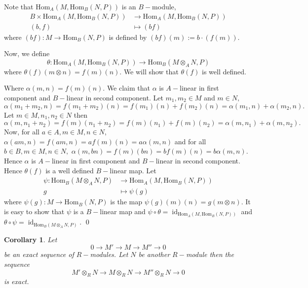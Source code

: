 \documentclass[11pt]{amsart}
\newtheorem{corollary}[theorem]{Corollary}%
\newcommand{\Homa}[1]{\text{Hom}_A\left(#1\right)}
\newcommand{\Homb}[1]{\text{Hom}_B\left(#1\right)}
\DeclareMathOperator{\id}{\text{id}}
\begin{document}
\proof Note that $\Homa{M,\Homb{N,P}}$ is an $B-$module, \begin{align*}
B\times \Homa{M,\Homb{N,P}}&\to \Homa{M,\Homb{N,P}}\\
(b,f)&\mapsto (bf)
\end{align*}
where $(bf):M\to \Homb{N,P}$ is defined by $(bf)(m):=b\cdot(f(m)).$

Now, we define $$\theta:\Homa{M,\Homb{N,P}}\to \Homb{M\otimes_A N,P}$$ where $\theta(f)(m\otimes n)=f(m)(n).$ We will show that $\theta(f)$ is well defined. 

\begin{center}
\end{center}

Where $\alpha(m,n)=f(m)(n).$ We claim that $\alpha$ is $A-$linear in first component and $B-$linear in second component. Let $m_1,m_2\in  M$ and $m\in N,$ $\alpha(m_1+m_2,n)=f(m_1+m_2)(n)=f(m_1)(n)+f(m_2)(n)=\alpha(m_1,n)+\alpha(m_2,n).$ Let $m\in M, n_1,n_2\in N$ then $\alpha(m,n_1+n_2)=f(m)(n_1+n_2)=f(m)(n_1)+f(m)(n_2)=\alpha(m,n_1)+\alpha(m,n_2).$ Now, for all $a\in A,m\in M,n\in N$, $\alpha(am,n)=f(am,n)=af(m)(n)=a\alpha(m,n)$ and for all $b\in B, m\in M,n\in N,$ $\alpha(m,bn)=f(m)(bn)=bf(m)(n)=b\alpha(m,n)$. Hence $\alpha$ is $A-$linear in first component and $B-$linear in second component. Hence $\theta(f)$ is a well defined $B-$linear map. Let \begin{align*}
\psi:\Homb{M\otimes_A N,P}&\to \Homa{M,\Homb{N,P}}\\
g&\mapsto \psi(g)
\end{align*}
where $\psi(g):M\to \Homb{N,P}$ is the map $\psi(g)(m)(n)=g(m\otimes n).$ It is easy to show that $\psi$ is a $B-$linear map and $\psi\circ \theta=\id_{\Homa{M,\Homb{N,P}}}$ and $\theta\circ \psi=\id_{\Homb{M\otimes_A N,P}}.$ \qed

\begin{corollary}
Let \begin{equation}
0\to M'\to M\to M''\to 0
\end{equation} 
be an exact sequence of $R-$modules. Let $N$ be another $R-$module then the sequence 
\begin{equation}
M'\otimes_R N\to M\otimes_R N\to M''\otimes_R N\to 0
\end{equation} 
is exact.
\end{corollary}
\end{document}
